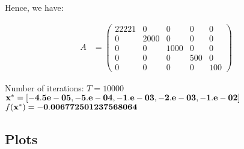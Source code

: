\documentclass{article}
\begin{document}
Hence, we have:

\begin{align*}
    A &= \begin{pmatrix}
        22221 & 0 & 0 & 0 & 0 \\
        0 & 2000 & 0 & 0 & 0 \\
        0 & 0 & 1000 & 0 & 0 \\
        0 & 0 & 0 & 500 & 0 \\
        0 & 0 & 0 & 0 & 100
    \end{pmatrix}
\end{align*}

\begin{center}
    Number of iterations: $T = 10000$ \\
    $\bf{x^*} = [-4.5e-05, -5.e-04, -1.e-03, -2.e-03, -1.e-02]$ \\
    $f(\bf{x^*}) = -0.006772501237568064$
\end{center}

\subsection*{Plots}
\end{document}
